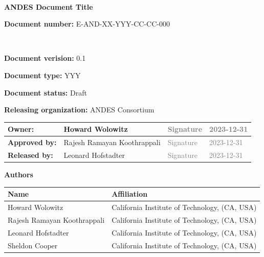 \documentclass[12pt,a4paper]{article}
\newcommand{\ESOdoctitle}{ANDES Document Title}
\newcommand{\ESOdocnumber}{E-AND-XX-YYY-CC-CC-000}
\newcommand{\ESOdocversion}{0.1}
\newcommand{\ESOdoctype}{YYY}
\newcommand{\ESOdocstatus}{Draft}  %
\newcommand{\ESOdocorganization}{ANDES Consortium}
\begin{document}
\vspace{3cm}

\begin{center}
  \begin{tcolorbox}[colframe=andesbrown, colback=andesgray, width=0.9\textwidth]
    \

    \begin{center}
      {\bf \large \textcolor{andesbrown} \ESOdoctitle{} }
    \end{center}

    \bigskip


    {\bf Document number:} \ESOdocnumber{}

    \

    {\bf Document verision:} \ESOdocversion{}

    {\bf Document type:} \ESOdoctype{}

    {\bf Document status:} \ESOdocstatus{}

    {\bf Releasing organization:} \ESOdocorganization{}
  \end{tcolorbox}
\end{center}

\vfill

\begin{center}
  \begin{tabularx}{\textwidth}{|l|X|l|l|}
    \hline
    {\bf \small Owner:}       &  Howard Wolowitz               & \textcolor{gray}{Signature} & \textcolor{gray}{2023-12-31} \\[0.8cm] \hline
    {\bf \small Approved by:} &  Rajesh Ramayan Koothrappali   & \textcolor{gray}{Signature} & \textcolor{gray}{2023-12-31} \\[0.8cm] \hline
    {\bf \small Released by:} &  Leonard Hofstadter            & \textcolor{gray}{Signature} & \textcolor{gray}{2023-12-31} \\[0.8cm] \hline
    \end{tabularx}
\end{center}


\restoregeometry



\newpage
\pagestyle{fancy}

\noindent
{\Large \bf Authors}
\medskip

\noindent
\begin{tabularx}{\textwidth}{|l|X|}
  \hline
      {\bf Name} & {\bf Affiliation}\\
      \hline
      Howard Wolowitz                 & California Institute of Technology, (CA, USA)\\
      Rajesh Ramayan Koothrappali     & California Institute of Technology, (CA, USA)\\
      Leonard Hofstadter              & California Institute of Technology, (CA, USA)\\
      Sheldon Cooper                  & California Institute of Technology, (CA, USA)\\
      \hline
\end{tabularx}
\end{document}
